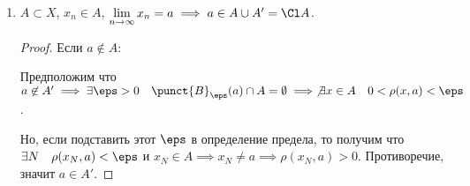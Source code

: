 \begin{properties}
\begin{enumerate}
\begin{proof}
                По определению предельной точки, $\forall{r > 0}\quad \punct{B}_{r}(a) \neq \emptyset$.

                Пусть $r_1 = 1$, $r_{n} = \min \{\frac{1}{n}, \rho(x_{n-1}, a)\}$, $x_{n}\in \punct{B}_{r_{n}}(a)$ - такой $x_{n}$ всегда можно выбрать, так-как окрестность непуста. Тогда $\rho(x_{n}, a) < r \implies \rho(x_{n}, a) < \frac{1}{n} \implies \rho(x_{n}, a) \to 0 \implies \lim\limits_{n \to \infty} x_{n} = a$, и при этом $\rho(x_{n}, a) < r_{n} < \rho(x_{n-1}, a)$.
            \end{proof}
        \item $A \subset X$, $x_{n}\in A$, $\lim\limits_{n \to \infty} x_{n} = a \implies a\in A \cup A' = \Cl A$.
            \begin{proof} \thmslashn
                
                Если $a \not\in A$:

                Предположим что $a \not\in A' \implies \exists{\eps > 0}\quad \punct{B}_{\eps}(a)\cap A = \emptyset \implies \not \exists{x\in A}\quad 0 < \rho(x, a) < \eps$.

                Но, если подставить этот $\eps$ в определение предела, то получим что $\exists{N}\quad \rho(x_{N}, a) < \eps$ и $x_{N}\in A \implies x_{N} \neq a \implies \rho(x_{N}, a) > 0$. Противоречие, значит $a\in A'$.
            \end{proof}
    \end{enumerate}
\end{properties}
